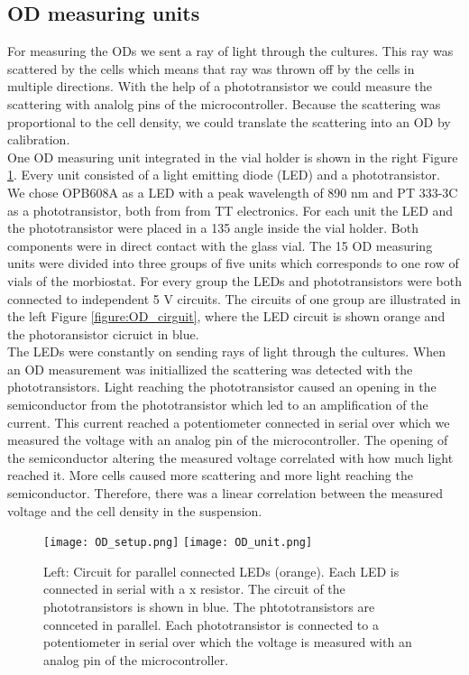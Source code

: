 \subsection{OD measuring units}
For measuring the ODs we sent a ray of light through the cultures. This ray was scattered by the cells which means that ray was thrown off by the cells in multiple directions. With the help of a phototransistor we could measure the scattering with analolg pins of the microcontroller. Because the scattering was proportional to the cell density, we could translate the scattering into an OD by calibration. \\
One OD measuring unit integrated in the vial holder is shown in  the right Figure \ref{figure:OD_unit}. Every unit consisted of a light emitting diode (LED) and a phototransistor. We chose OPB608A as a LED with a peak wavelength of 890 nm and PT 333-3C as a phototransistor, both from from TT electronics. For each unit the LED and the phototransistor were placed in a 135 \degree \space angle inside the vial holder. Both components were in direct contact with the glass vial.
The 15 OD measuring units were divided into three groups of five units which corresponds to one row of vials of the morbiostat. For every group the LEDs and phototransistors were both connected to independent 5 V circuits. The circuits of one group are illustrated in the left Figure \ref{figure:OD_cirguit}, where the LED circuit is shown orange and the photoransistor cicruict in blue. \\
The LEDs were constantly on sending rays of light through the cultures. When an OD measurement was initiallized the scattering was detected with the phototransistors. Light reaching the phototransistor caused an opening in the semiconductor from the phototransistor which led to an amplification of the current. This current reached a potentiometer connected in serial over which we measured the voltage with an analog pin of the microcontroller. The opening of the semiconductor altering the measured voltage correlated with how much light reached it. More cells caused more scattering and more light reaching the semiconductor. Therefore, there was a linear correlation between the measured voltage and the cell density in the suspension. \\

\label{section:OD}
\begin{figure}
	\texttt{[image: OD\_setup.png]}
	\texttt{[image: OD\_unit.png]}
	\caption{Left: Circuit for parallel connected LEDs (orange). Each LED is connected in serial with a x \textOmega \space resistor. The circuit of the phototransistors is shown in blue. The phtototransistors are connceted in parallel. Each phototransistor is connected to a potentiometer in serial over which the voltage is measured with an analog pin of the microcontroller.}
	\label{figure:OD_cirguit}
	\label{figure:OD_unit}
\end{figure}

